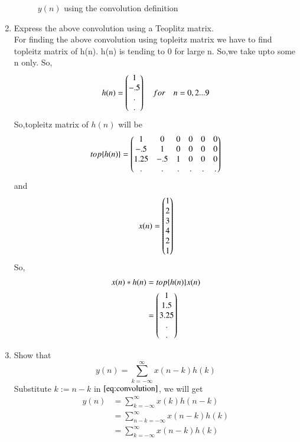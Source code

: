 \documentclass[journal,12pt,twocolumn]{IEEEtran}
\renewcommand\thesection{\arabic{section}}
\begin{document}
\begin{enumerate}[label=\thesection.\arabic*]
\begin{figure}[ht!]
                \caption{$y(n)$ using the convolution definition}
                \label{ynconv}
           \end{figure}
     \item Express the above convolution using a Teoplitz matrix.\\
           \solution
           For finding the above convolution using topleitz matrix we have to find topleitz matrix of h(n).
           h(n) is tending to 0 for large n.
           So,we take upto some n only.
           So,
           \begin{align}
                h(n)=\begin{pmatrix}1 \\-.5\\.\\.\end{pmatrix} \quad for \quad n=0,2 ...9
           \end{align}
           So,topleitz matrix of $h(n)$ will be
           \begin{align}
                top\{h(n)\}=\begin{pmatrix}1 & 0 & 0 & 0 & 0 & 0 \\-.5 &1 &0 &0 &0 &0\\1.25&-.5&1&0&0&0\\. &.& .& .& .&. \end{pmatrix}
           \end{align}
           and
           \begin{align}
                x(n)=\begin{pmatrix}1 \\2\\3\\4\\2\\1\end{pmatrix}
           \end{align}
           So,
           \begin{align}
                x(n)*h(n) & =top\{h(n)\}x(n) \\
                          & =\begin{pmatrix}1        \\1.5\\3.25\\.\\.\end{pmatrix}
           \end{align}
     \item Show that\\
           \begin{equation}
                y(n) =  \sum_{k=-\infty}^{\infty}x(n-k)h(k)
           \end{equation}
           \solution Substitute $k := n-k$ in $\eqref{eq:convolution}$, we will get
           \begin{align}
                y(n) & = \sum_{k=-\infty}^{\infty}x(k)h(n-k)     \\
                     & = \sum_{n - k=-\infty}^{\infty}x(n-k)h(k) \\
                     & = \sum_{k = -\infty}^{\infty}x(n-k)h(k)
           \end{align}

\end{enumerate}
\end{document}
